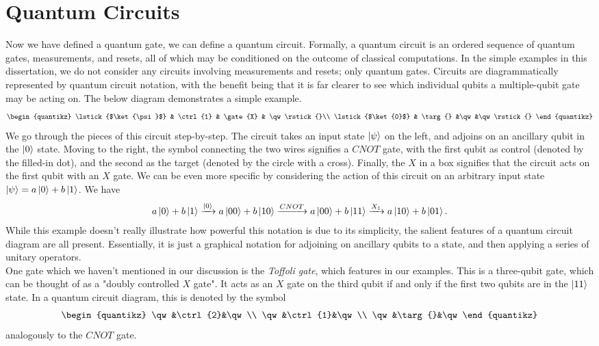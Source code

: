 \documentclass[12pt,a4paper]{report}
\numberwithin{equation}{section}
\theoremstyle{definition}
\theoremstyle{theorem}
\theoremstyle{theorem}
\theoremstyle{example}
\theoremstyle{definition}
\begin{document}
\section{Quantum Circuits}
Now we have defined a quantum gate, we can define a quantum circuit. Formally, a quantum circuit is an ordered sequence of quantum gates, measurements, and resets, all of which may be conditioned on the outcome of classical computations. In the simple examples in this dissertation, we do not consider any circuits involving measurements and resets; only quantum gates. Circuits are diagrammatically represented by quantum circuit notation, with the benefit being that it is far clearer to see which individual qubits a multiple-qubit gate may be acting on. The below diagram demonstrates a simple example.
\begin{equation}
	\begin{quantikz}
		\lstick{$\ket{\psi}$} & \ctrl{1} & \gate{X} & \qw\rstick{}\\
		\lstick{$\ket{0}$} & \targ{} &\qw &\qw\rstick{}
	\end{quantikz}
\end{equation}
We go through the pieces of this circuit step-by-step. The circuit takes an input state $\ket{\psi}$ on the left, and adjoins on an ancillary qubit in the $\ket{0}$ state. Moving to the right, the symbol connecting the two wires signifies a $CNOT$ gate, with the first qubit as control (denoted by the filled-in dot), and the second as the target (denoted by the circle with a cross). Finally, the $X$ in a box signifies that the circuit acts on the first qubit with an $X$ gate. We can be even more specific by considering the action of this circuit on an arbitrary input state $\ket{\psi}=a\ket{0}+b\ket{1}$. We have
\begin{equation}
	\begin{aligned}
		a\ket{0}+b\ket{1}\xrightarrow{\ket{0}}a\ket{00}+b\ket{10}
		\xrightarrow{CNOT}a\ket{00}+b\ket{11}
		\xrightarrow{X_{1}}a\ket{10}+b\ket{01}.
	\end{aligned}
\end{equation}
While this example doesn't really illustrate how powerful this notation is due to its simplicity, the salient features of a quantum circuit diagram are all present. Essentially, it is just a graphical notation for adjoining on ancillary qubits to a state, and then applying a series of unitary operators.\\
One gate which we haven't mentioned in our discussion is the \textit{Toffoli gate}, which features in our examples. This is a three-qubit gate, which can be thought of as a "doubly controlled $X$ gate". It acts as an $X$ gate on the third qubit if and only if the first two qubits are in the $\ket{11}$ state. In a quantum circuit diagram, this is denoted by the symbol
\begin{equation}
	\begin{quantikz}
		\qw&\ctrl{2}&\qw\\
		\qw&\ctrl{1}&\qw\\
		\qw&\targ{}&\qw
	\end{quantikz}
\end{equation}
analogously to the $CNOT$ gate.



\end{document}

